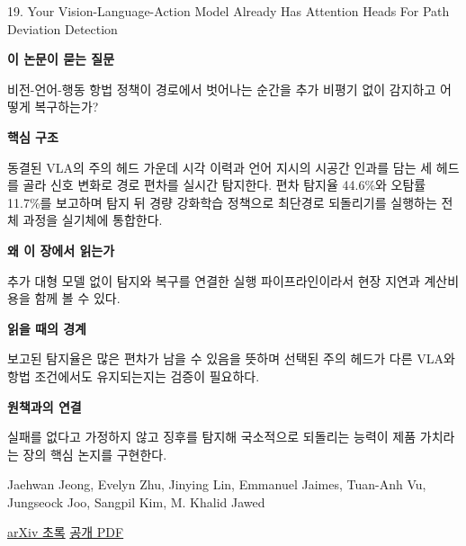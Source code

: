 \documentclass[11pt,openany]{book}
\begin{document}
\begin{termcard}{19. Your Vision-Language-Action Model Already Has Attention Heads For Path Deviation Detection}

\par

\medskip

{\sffamily\bfseries\color{deepblue} 이 논문이 묻는 질문}\par

비전-언어-행동 항법 정책이 경로에서 벗어나는 순간을 추가 비평기 없이 감지하고 어떻게 복구하는가?

\smallskip

{\sffamily\bfseries\color{deepblue} 핵심 구조}\par

동결된 VLA의 주의 헤드 가운데 시각 이력과 언어 지시의 시공간 인과를 담는 세 헤드를 골라 신호 변화로 경로 편차를 실시간 탐지한다. 편차 탐지율 44.6\%와 오탐률 11.7\%를 보고하며 탐지 뒤 경량 강화학습 정책으로 최단경로 되돌리기를 실행하는 전체 과정을 실기체에 통합한다.

\smallskip

{\sffamily\bfseries\color{deepblue} 왜 이 장에서 읽는가}\par

추가 대형 모델 없이 탐지와 복구를 연결한 실행 파이프라인이라서 현장 지연과 계산비용을 함께 볼 수 있다.

\smallskip

{\sffamily\bfseries\color{coral} 읽을 때의 경계}\par

보고된 탐지율은 많은 편차가 남을 수 있음을 뜻하며 선택된 주의 헤드가 다른 VLA와 항법 조건에서도 유지되는지는 검증이 필요하다.

\smallskip

{\sffamily\bfseries\color{teal} 원책과의 연결}\par

실패를 없다고 가정하지 않고 징후를 탐지해 국소적으로 되돌리는 능력이 제품 가치라는 장의 핵심 논지를 구현한다.

\medskip

{\footnotesize\color{muted} Jaehwan Jeong, Evelyn Zhu, Jinying Lin, Emmanuel Jaimes, Tuan-Anh Vu, Jungseock Joo, Sangpil Kim, M. Khalid Jawed\par

\href{https://arxiv.org/abs/2603.13782}{arXiv 초록} \quad \href{https://arxiv.org/pdf/2603.13782}{공개 PDF}\par}

\end{termcard}
\end{document}
